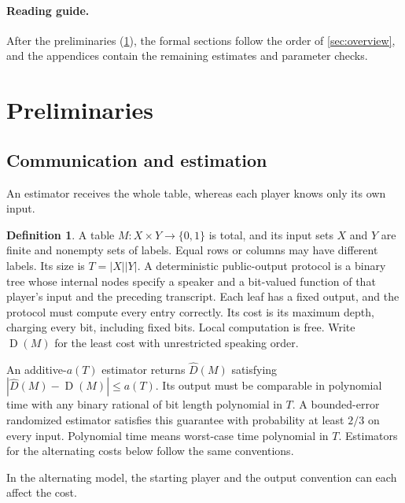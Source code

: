 \documentclass[11pt,letterpaper]{article} \usepackage[utf8]{inputenc}
\theoremstyle{plain} \newtheorem{theorem}{Theorem}[section]
\theoremstyle{definition} \newaliascnt{definition}{theorem}
\newtheorem{definition}[definition]{Definition} \aliascntresetthe{definition}
\newcommand{\D}{\operatorname{D}}
\begin{document}
\paragraph{Reading guide.}
After the preliminaries (\cref{sec:models}), the formal sections follow the order of
\cref{sec:overview}, and the appendices contain the remaining estimates
and parameter checks.


\clearpage
\section{Preliminaries}
\label{sec:models}

\subsection{Communication and estimation}

An estimator receives the whole table, whereas each player knows only its own input.

\begin{definition}\label{def:table-estimation}
A table $M:X\times Y\to\{0,1\}$ is total, and its input sets $X$ and $Y$ are
finite and nonempty sets of labels. Equal rows or columns may have different labels.
Its size is $T=|X||Y|$.
A deterministic public-output protocol is a binary tree whose internal
nodes specify a speaker and a bit-valued function of that player's input
and the preceding transcript. Each leaf has a fixed output, and the
protocol must compute every entry correctly. Its cost is its maximum
depth, charging every bit, including fixed bits. Local computation is free.
Write $\D(M)$ for the least cost with unrestricted speaking order.

An additive-$a(T)$ estimator returns $\widehat D(M)$ satisfying
$|\widehat D(M)-\D(M)|\le a(T)$. Its output must be comparable in polynomial time with any binary rational of bit length polynomial in $T$. A bounded-error
randomized estimator satisfies this guarantee with probability at least
$2/3$ on every input. Polynomial time means worst-case time polynomial
in $T$. Estimators for the alternating costs below follow the same conventions.
\end{definition}

In the alternating model, the starting player and the output convention
can each affect the cost.
\end{document}
